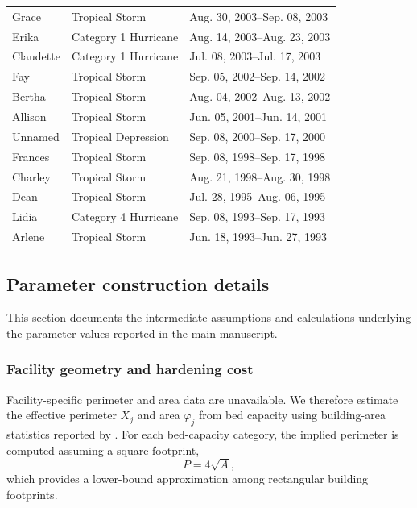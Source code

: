 \documentclass[preprint,11pt,authoryear]{elsarticle}
\begin{document}
\begin{table}[H]
\begin{tabular}{lll}
Grace & Tropical Storm & Aug. 30, 2003--Sep. 08, 2003\\
Erika & Category 1 Hurricane & Aug. 14, 2003--Aug. 23, 2003\\
Claudette & Category 1 Hurricane & Jul. 08, 2003--Jul. 17, 2003\\
Fay & Tropical Storm & Sep. 05, 2002--Sep. 14, 2002\\
Bertha & Tropical Storm & Aug. 04, 2002--Aug. 13, 2002\\
Allison & Tropical Storm & Jun. 05, 2001--Jun. 14, 2001\\
Unnamed & Tropical Depression & Sep. 08, 2000--Sep. 17, 2000\\
Frances & Tropical Storm & Sep. 08, 1998--Sep. 17, 1998\\
Charley & Tropical Storm & Aug. 21, 1998--Aug. 30, 1998\\
Dean & Tropical Storm & Jul. 28, 1995--Aug. 06, 1995\\
Lidia & Category 4 Hurricane & Sep. 08, 1993--Sep. 17, 1993\\
Arlene & Tropical Storm & Jun. 18, 1993--Jun. 27, 1993\\
\bottomrule
\end{tabular}
\end{table}

\subsection{Parameter construction details}
\label{sec:supp_parameter_construction}

This section documents the intermediate assumptions and calculations underlying the parameter values reported in the main manuscript.

\subsubsection{Facility geometry and hardening cost}
\label{sec:supp_hardening_cost}

Facility-specific perimeter and area data are unavailable. We therefore
estimate the effective perimeter $X_j$ and area $\varphi_j$ from bed capacity
using building-area statistics reported by \citet{definitivehc_sqft}.
For each bed-capacity category, the implied perimeter is computed assuming a
square footprint,
\[
P=4\sqrt{A},
\]
which provides a lower-bound approximation among rectangular building
footprints.
\end{document}
